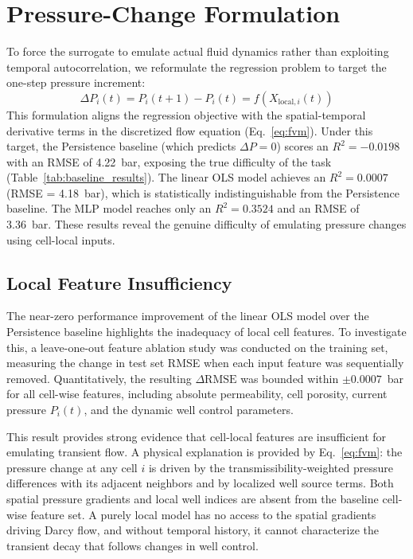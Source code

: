 \documentclass[10pt,twocolumn]{article}
\begin{document}
\section{Pressure-Change Formulation}
To force the surrogate to emulate actual fluid dynamics rather than exploiting temporal autocorrelation, we reformulate the regression problem to target the one-step pressure increment:
\begin{equation}
\label{eq:delta_p_def}
\Delta P_i(t) = P_i(t+1) - P_i(t) = f(X_{\text{local}, i}(t))
\end{equation}
This formulation aligns the regression objective with the spatial-temporal derivative terms in the discretized flow equation (Eq.~\ref{eq:fvm}). Under this target, the Persistence baseline (which predicts $\Delta P = 0$) scores an $R^2 = -0.0198$ with an RMSE of 4.22~bar, exposing the true difficulty of the task (Table~\ref{tab:baseline_results}). The linear OLS model achieves an $R^2 = 0.0007$ (RMSE = 4.18~bar), which is statistically indistinguishable from the Persistence baseline. The MLP model reaches only an $R^2 = 0.3524$ and an RMSE of 3.36~bar. These results reveal the genuine difficulty of emulating pressure changes using cell-local inputs.

\subsection{Local Feature Insufficiency}
The near-zero performance improvement of the linear OLS model over the Persistence baseline highlights the inadequacy of local cell features. To investigate this, a leave-one-out feature ablation study was conducted on the training set, measuring the change in test set RMSE when each input feature was sequentially removed. Quantitatively, the resulting $\Delta \text{RMSE}$ was bounded within $\pm 0.0007$~bar for all cell-wise features, including absolute permeability, cell porosity, current pressure $P_i(t)$, and the dynamic well control parameters.

This result provides strong evidence that cell-local features are insufficient for emulating transient flow. A physical explanation is provided by Eq.~\ref{eq:fvm}: the pressure change at any cell $i$ is driven by the transmissibility-weighted pressure differences with its adjacent neighbors and by localized well source terms. Both spatial pressure gradients and local well indices are absent from the baseline cell-wise feature set. A purely local model has no access to the spatial gradients driving Darcy flow, and without temporal history, it cannot characterize the transient decay that follows changes in well control.
\end{document}
